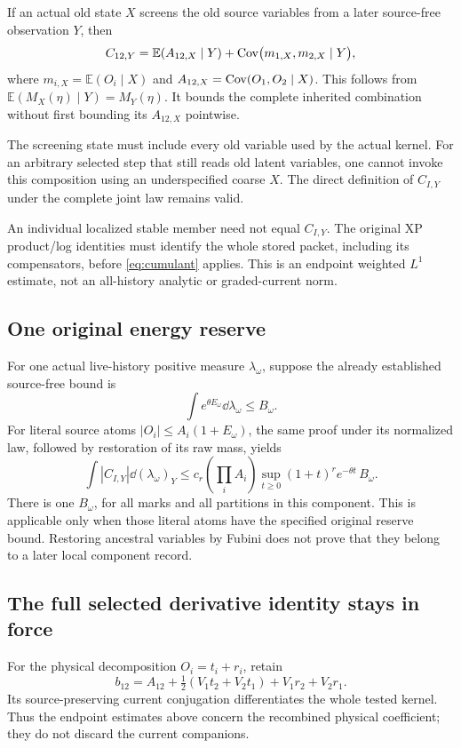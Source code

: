 \documentclass[11pt,letterpaper]{article}
\theoremstyle{remark}\newtheorem{remark}[theorem]{Remark}
\newcommand{\E}{\mathbb E}
\begin{document}
If an actual old state \(X\) screens the old source variables from a later source-free observation \(Y\), then
\[
 C_{12,Y}
 =\E(A_{12,X}\mid Y)+
 \Cov\bigl(m_{1,X},m_{2,X}\mid Y\bigr),
\]
where \(m_{i,X}=\E(O_i\mid X)\) and
\(A_{12,X}=\operatorname{Cov}(O_1,O_2\mid X)\). This follows from
\(\E(M_X(\eta)\mid Y)=M_Y(\eta)\). It bounds the complete inherited combination without first bounding its \(A_{12,X}\) pointwise.

The screening state must include every old variable used by the actual kernel. For an arbitrary selected step that still reads old latent variables, one cannot invoke this composition using an underspecified coarse \(X\). The direct definition of \(C_{I,Y}\) under the complete joint law remains valid.

An individual localized stable member need not equal \(C_{I,Y}\). The original XP product/log identities must identify the whole stored packet, including its compensators, before \eqref{eq:cumulant} applies. This is an endpoint weighted \(L^1\) estimate, not an all-history analytic or graded-current norm.

\subsection{One original energy reserve}

For one actual live-history positive measure \(\lambda_\omega\), suppose the already established source-free bound is
\[
 \int e^{\theta E_\omega}\dd\lambda_\omega\le B_\omega.
\]
For literal source atoms \(|O_i|\le A_i(1+E_\omega)\), the same proof under its normalized law, followed by restoration of its raw mass, yields
\begin{equation}\label{eq:onereserve}
 \int |C_{I,Y}|\dd(\lambda_\omega)_Y
 \le c_r\left(\prod_iA_i\right)
 \sup_{t\ge0}(1+t)^re^{-\theta t}\,B_\omega.
\end{equation}
There is one \(B_\omega\), for all marks and all partitions in this component. This is applicable only when those literal atoms have the specified original reserve bound. Restoring ancestral variables by Fubini does not prove that they belong to a later local component record.

\subsection{The full selected derivative identity stays in force}

For the physical decomposition \(O_i=t_i+r_i\), retain
\[
 b_{12}=A_{12}+\tfrac12(V_1t_2+V_2t_1)+V_1r_2+V_2r_1.
\]
Its source-preserving current conjugation differentiates the whole tested kernel. Thus the endpoint estimates above concern the recombined physical coefficient; they do not discard the current companions.
\end{document}
